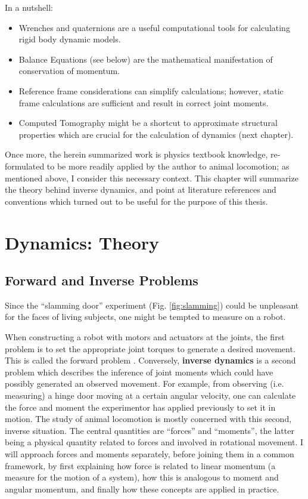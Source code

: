 In a nutshell:
\begin{itemize}
\item Wrenches and quaternions are a useful computational tools for calculating rigid body dynamic models.
\item Balance Equations (see below) are the mathematical manifestation of conservation of momentum.
\item Reference frame considerations can simplify calculations; however, static frame calculations are sufficient and result in correct joint moments.
\end{itemize}

\begin{itemize}
\item Computed Tomography might be a shortcut to approximate structural properties which are crucial for the calculation of dynamics (next chapter).
\end{itemize}


Once more, the herein summarized work is physics textbook knowledge, re-formulated to be more readily applied by the author to animal locomotion; as mentioned above, I consider this necessary context.
This chapter will summarize the theory behind inverse dynamics, and point at literature references and conventions which turned out to be useful for the purpose of this thesis.


\section{Dynamics: Theory}
\label{sec:org1cd7f02}
\subsection{Forward and Inverse Problems}
\label{sec:orgfb9b69f}
Since the ``slamming door'' experiment (Fig. \ref{fig:slamming}) could be unpleasant for the faces of living subjects, one might be tempted to measure on a robot.

When constructing a robot with motors and actuators at the joints, the first problem is to set the appropriate joint torques to generate a desired movement.
This is called the forward problem \citep{Lynch2017}.
Conversely, \textbf{inverse dynamics} is a second problem which describes the inference of joint moments which could have possibly generated an observed movement.
For example, from observing (i.e. measuring) a hinge door moving at a certain angular velocity, one can calculate the force and moment the experimentor has applied previously to set it in motion.
The study of animal locomotion is mostly concerned with this second, inverse situation.
The central quantities are ``forces'' and ``moments'', the latter being a physical quantity related to forces and involved in rotational movement.
I will approach forces and moments separately, before joining them in a common framework, by first explaining how force is related to linear momentum (a measure for the motion of a system), how this is analogous to moment and angular momentum, and finally how these concepts are applied in practice.


